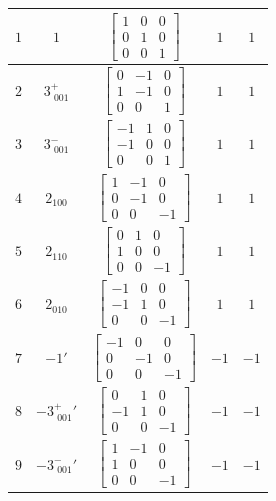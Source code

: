 \documentclass[fleqn,8pt]{jsarticle}
\begin{document}
\begin{longtable}{ccccc}
$ 1 $ & $ 1 $ & $ \begin{bmatrix} 1 & 0 & 0 \\ 0 & 1 & 0 \\ 0 & 0 & 1 \end{bmatrix} $ & $ 1 $ & $ 1 $ \\ \hline
$ 2 $ & $ 3^{+}_{\,\,001} $ & $ \begin{bmatrix} 0 & -1 & 0 \\ 1 & -1 & 0 \\ 0 & 0 & 1 \end{bmatrix} $ & $ 1 $ & $ 1 $ \\ \hline
$ 3 $ & $ 3^{-}_{\,\,001} $ & $ \begin{bmatrix} -1 & 1 & 0 \\ -1 & 0 & 0 \\ 0 & 0 & 1 \end{bmatrix} $ & $ 1 $ & $ 1 $ \\ \hline
$ 4 $ & $ 2{}_{100} $ & $ \begin{bmatrix} 1 & -1 & 0 \\ 0 & -1 & 0 \\ 0 & 0 & -1 \end{bmatrix} $ & $ 1 $ & $ 1 $ \\ \hline
$ 5 $ & $ 2{}_{110} $ & $ \begin{bmatrix} 0 & 1 & 0 \\ 1 & 0 & 0 \\ 0 & 0 & -1 \end{bmatrix} $ & $ 1 $ & $ 1 $ \\ \hline
$ 6 $ & $ 2{}_{010} $ & $ \begin{bmatrix} -1 & 0 & 0 \\ -1 & 1 & 0 \\ 0 & 0 & -1 \end{bmatrix} $ & $ 1 $ & $ 1 $ \\ \hline
$ 7 $ & $ -1{}' $ & $ \begin{bmatrix} -1 & 0 & 0 \\ 0 & -1 & 0 \\ 0 & 0 & -1 \end{bmatrix} $ & $ -1 $ & $ -1 $ \\ \hline
$ 8 $ & $ -3^{+}_{\,\,001}{}' $ & $ \begin{bmatrix} 0 & 1 & 0 \\ -1 & 1 & 0 \\ 0 & 0 & -1 \end{bmatrix} $ & $ -1 $ & $ -1 $ \\ \hline
$ 9 $ & $ -3^{-}_{\,\,001}{}' $ & $ \begin{bmatrix} 1 & -1 & 0 \\ 1 & 0 & 0 \\ 0 & 0 & -1 \end{bmatrix} $ & $ -1 $ & $ -1 $ \\ \hline

\end{longtable}
\end{document}

